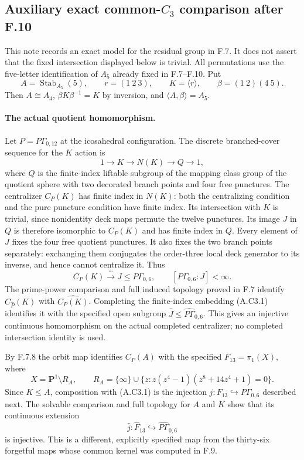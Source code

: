 \subsection*{Auxiliary exact common-$C_3$ comparison after F.10}

This note records an exact model for the residual group in F.7.
It does not assert that the fixed intersection displayed below is trivial.
All permutations use the five-letter identification of $A_5$ already
fixed in F.7--F.10.  Put
\[
 A=\operatorname{Stab}_{A_5}(5),\qquad
 r=(1\ 2\ 3),\qquad K=\langle r\rangle,
 \qquad\beta=(1\ 2)(4\ 5).
\]
Then $A\cong A_4$, $\beta K\beta^{-1}=K$ by inversion,
and $\langle A,\beta\rangle=A_5$.

\paragraph{The actual quotient homomorphism.}
Let $P=P\Gamma_{0,12}$ at the icosahedral configuration.
The discrete branched-cover sequence for the $K$ action is
\[
 1\longrightarrow K\longrightarrow N(K)
       \longrightarrow Q\longrightarrow1,
\]
where $Q$ is the finite-index liftable subgroup of the
mapping class group of the quotient sphere with two decorated
branch points and four free punctures.  The centralizer
$C_P(K)$ has finite index in $N(K)$: both the centralizing
condition and the pure puncture condition have finite index.
Its intersection with $K$ is trivial, since nonidentity deck
maps permute the twelve punctures.  Its image $J$ in $Q$ is
therefore isomorphic to $C_P(K)$ and has finite index in $Q$.
Every element of $J$ fixes the four free quotient punctures.
It also fixes the two branch points separately: exchanging
them conjugates the order-three local deck generator to its
inverse, and hence cannot centralize it.  Thus
\[
             C_P(K)\xrightarrow{\ \sim\ }J
                         \leq P\Gamma_{0,6},
               \qquad [P\Gamma_{0,6}:J]<\infty.          \tag{A.C3.1}
\]
The prime-power comparison and full induced topology proved
in F.7 identify $C_{\widehat P}(K)$ with
$\widehat{C_P(K)}$.  Completing the finite-index embedding
(A.C3.1) identifies it with the specified open subgroup
$\widehat J\leq\widehat{P\Gamma}_{0,6}$.  This gives an
injective continuous homomorphism on the actual completed
centralizer; no completed intersection identity is used.

By F.7.8 the orbit map identifies $C_P(A)$ with the specified
$F_{13}=\pi_1(X)$, where
\[
 X=\mathbf P^1\setminus R_A,\qquad
 R_A=\{\infty\}\cup\{z:z(z^4-1)(z^8+14z^4+1)=0\}.
\]
Since $K\leq A$, composition with (A.C3.1) is the injection
$j:F_{13}\hookrightarrow P\Gamma_{0,6}$ described next.
The solvable comparison and full topology for $A$ and $K$
show that its continuous extension
\[
                \widehat j:\widehat F_{13}
                       \hookrightarrow\widehat{P\Gamma}_{0,6}
                                                               \tag{A.C3.2}
\]
is injective.  This is a different, explicitly specified map
from the thirty-six forgetful maps whose common kernel was
computed in F.9.

